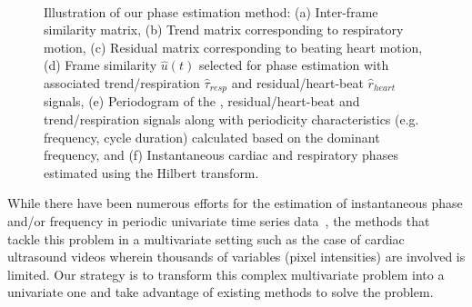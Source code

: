 \documentclass[journal]{IEEEtran}
\newcommand{\rk}[1]{{\color{blue}{#1}}}
\newcounter{lfigcounter}
\def\ionbox#1{\makebox[#1]{(\alph{lfigcounter})}\stepcounter{lfigcounter}}
\begin{document}
\begin{figure}[!t]
\ionbox{6.0in}\\
%
\caption{Illustration of our phase estimation method: (a) Inter-frame similarity matrix, (b) Trend matrix corresponding to respiratory motion, (c) Residual matrix corresponding to beating heart motion, (d) Frame similarity $\hat{u}(t)$ selected for phase estimation with associated trend/respiration $\hat{\tau}_{resp}$ and residual/heart-beat $\hat{r}_{heart}$ signals, (e) Periodogram of the \rk{frame similarity}, residual/heart-beat and trend/respiration signals along with periodicity characteristics (e.g. frequency, cycle duration) calculated based on the dominant frequency, and (f) Instantaneous cardiac and respiratory phases estimated using the Hilbert transform.}
\label{fig:phase_estimation}
\end{figure}
%

While there have been numerous efforts for the estimation of instantaneous phase and/or frequency in periodic univariate time series data~\cite{Boashash1992,Rosenblum2001,Freund2003,Luo2003,Lu2013}, the methods that tackle this problem in a multivariate setting such as the case of cardiac ultrasound videos wherein thousands of variables (pixel intensities) are involved is limited. Our strategy is to transform this complex multivariate problem into a univariate one and take advantage of existing methods to solve the problem. 
%
\end{document}
